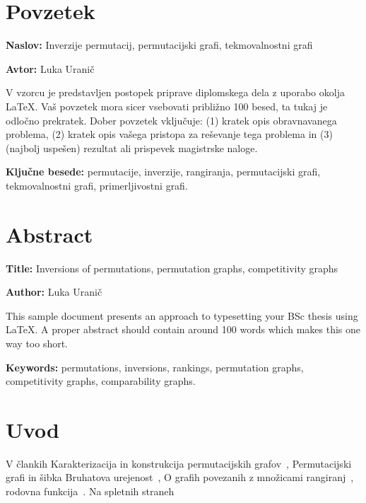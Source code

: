 \documentclass[a4paper, 12pt]{book}
\newcommand{\ttitle}{Inverzije permutacij, permutacijski grafi, tekmovalnostni grafi}
\newcommand{\ttitleEn}{Inversions of permutations, permutation graphs, competitivity graphs}
\newcommand{\tauthor}{Luka Uranič}
\newcommand{\tkeywords}{permutacije, inverzije, rangiranja, permutacijski grafi, tekmovalnostni grafi, primerljivostni grafi}
\newcommand{\tkeywordsEn}{permutations, inversions, rankings, permutation graphs, competitivity graphs, comparability graphs}
\newcommand{\clearemptydoublepage}{\newpage{\pagestyle{empty}\cleardoublepage}}
\begin{document}

\chapter*{Povzetek}

\noindent\textbf{Naslov:} \ttitle
\bigskip

\noindent\textbf{Avtor:} \tauthor
\bigskip

\noindent V vzorcu je predstavljen postopek priprave diplomskega dela z uporabo okolja \LaTeX. Vaš povzetek mora sicer vsebovati približno 100 besed, ta tukaj je odločno prekratek.
Dober povzetek vključuje: (1) kratek opis obravnavanega problema, (2) kratek opis vašega pristopa za reševanje tega problema in (3) (najbolj uspešen) rezultat ali prispevek magistrske naloge.

\bigskip

\noindent\textbf{Ključne besede:} \tkeywords.
\clearemptydoublepage

\chapter*{Abstract}

\noindent\textbf{Title:} \ttitleEn
\bigskip

\noindent\textbf{Author:} \tauthor
\bigskip

\noindent This sample document presents an approach to typesetting your BSc thesis using \LaTeX. 
A proper abstract should contain around 100 words which makes this one way too short.
\bigskip

\noindent\textbf{Keywords:} \tkeywordsEn.
\clearemptydoublepage

\mainmatter
\setcounter{page}{1}
\pagestyle{fancy}

\chapter {Uvod}
V člankih Karakterizacija in konstrukcija permutacijskih grafov~\cite{charectarizationPermutationGraphs}, Permutacijski grafi in šibka Bruhatova urejenost~\cite{bruhadOrder}, O grafih povezanih z množicami rangiranj~\cite{setsOfRankings}, rodovna funkcija~\cite{generatingFunction}. Na spletnih straneh ~\cite{permutation}~\cite{inversion}~\cite{permutationGraph}~\cite{permutationGroup}~\cite{factorialNumberSystem}
\end{document}
